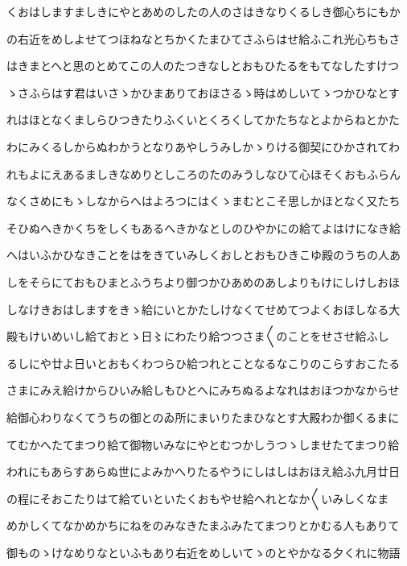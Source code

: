 \documentclass[a4paper,11pt,landscape]{ltjtarticle}
\begin{document}
くおはしますましきにやとあめのしたの人のさはきなりくるしき御心ちにもか
\par\medskip
の右近をめしよせてつほねなとちかくたまひてさふらはせ給ふこれ光心ちもさ
\par\medskip
はきまとへと思のとめてこの人のたつきなしとおもひたるをもてなしたすけつ
\par\medskip
ゝさふらはす君はいさゝかひまありておほさるゝ時はめしいてゝつかひなとす
\par\medskip
れはほとなくましらひつきたりふくいとくろくしてかたちなとよからねとかた
\par\medskip
わにみくるしからぬわかうとなりあやしうみしかゝりける御契にひかされてわ
\par\medskip
れもよにえあるましきなめりとしころのたのみうしなひて心ほそくおもふらん
\par\medskip
なくさめにもゝしなからへはよろつにはくゝまむとこそ思しかほとなく又たち
\par\medskip
そひぬへきかくちをしくもあるへきかなとしのひやかにの給てよはけになき給
\par\medskip
へはいふかひなきことをはをきていみしくおしとおもひきこゆ殿のうちの人あ
\par\medskip
しをそらにておもひまとふうちより御つかひあめのあしよりもけにしけしおほ
\par\medskip
しなけきおはしますをきゝ給にいとかたしけなくてせめてつよくおほしなる大
\par\medskip
殿もけいめいし給ておとゝ日〻にわたり給つつさま〱のことをせさせ給ふし
\par\medskip
るしにや廿よ日いとおもくわつらひ給つれとことなるなこりのこらすおこたる
\par\medskip
さまにみえ給けからひいみ給しもひとへにみちぬるよなれはおほつかなからせ
\par\medskip
給御心わりなくてうちの御とのゐ所にまいりたまひなとす大殿わか御くるまに
\par\medskip
てむかへたてまつり給て御物いみなにやとむつかしうつゝしませたてまつり給
\par\medskip
われにもあらすあらぬ世によみかへりたるやうにしはしはおほえ給ふ九月廿日
\par\medskip
の程にそおこたりはて給ていといたくおもやせ給へれとなか〱いみしくなま
\par\medskip
めかしくてなかめかちにねをのみなきたまふみたてまつりとかむる人もありて
\par\medskip
御ものゝけなめりなといふもあり右近をめしいてゝのとやかなる夕くれに物語
\par\medskip
\end{document}
